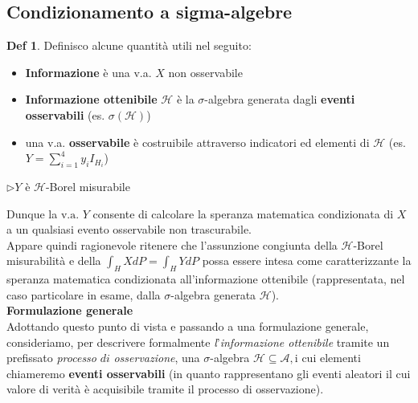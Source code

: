 \documentclass[a4paper,11pt]{article}
\theoremstyle{plain}
\theoremstyle{definition}
\newtheorem{defn}{Def}[section]
\theoremstyle{remark}
\begin{document}
\subsection{Condizionamento a sigma-algebre}
\begin{defn} Definisco alcune quantità utili nel seguito:
\begin{itemize}
    \item   \textbf{Informazione}   è una v.a. $X$ non osservabile
    \item   \textbf{Informazione ottenibile} $\mathcal{H}$ è la $\sigma$-algebra generata dagli \textbf{eventi osservabili} (es. $\sigma(\mathcal{H})$)
    \item una v.a. \textbf{osservabile} è costruibile attraverso indicatori ed elementi di $\mathcal{H}$ (es. $Y=\sum_{i=1}^4 y_i I_{H_i}$)
\end{itemize}
\end{defn}
\noindent
$\triangleright  Y$ è $\mathcal{H}$-Borel misurabile 

\noindent
Dunque la $\mathrm{v}.\mathrm{a}.$ $Y$ consente di calcolare la speranza matematica condizionata di $X$ a un qualsiasi evento osservabile non trascurabile. \\


\noindent
Appare quindi ragionevole ritenere che l'assunzione congiunta della $\mathcal{H}$-Borel misurabilità $\mathrm{e}$ della $\displaystyle \int_H XdP=\int_H YdP$ possa essere intesa come caratterizzante la speranza matematica condizionata all'informazione ottenibile (rappresentata, nel caso particolare in esame, dalla $\sigma$-algebra generata $\mathcal{H}$).\\

\noindent
\textbf{Formulazione generale}\\
Adottando questo punto di vista $\mathrm{e}$ passando a una formulazione generale, consideriamo, per descrivere formalmente {\it l}'{\it informazione ottenibile} tramite un prefissato {\it processo} $di$ {\it osservazione}, una $\sigma$-algebra $\mathcal{H}\subseteq \mathcal{A}, \mathrm{i}$ cui elementi chiameremo \textbf{eventi osservabili} (in quanto rappresentano gli eventi aleatori il cui valore di verità è acquisibile tramite il processo di osservazione).\\
\end{document}
